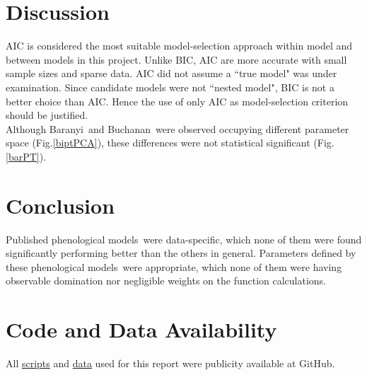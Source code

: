 \documentclass[a4paper, 11pt]{article}
\newcommand{\pms}{phenological models}
\newcommand{\fba}{Baranyi}
\newcommand{\fbu}{Buchanan}
\begin{document}
	\section*{Discussion}
	
	AIC is considered the most suitable model-selection approach within model and between models in this project.  Unlike BIC, AIC are more accurate with small sample sizes\autocite{acquah2010comparison,kuha2004aic} and sparse data\autocite{kuha2004aic}.  AIC did not assume a ``true model" was under examination\autocite{aho2014model,vrieze2012model,yang2005can}.  Since candidate models were not ``nested model", BIC is not a better choice than AIC\autocite{wang2006comparison}.  Hence the use of only AIC as model-selection criterion should be justified.\\
	
	Although \fba\ and \fbu\ were observed occupying different parameter space (Fig.\ref{biptPCA}), these differences were not statistical significant (Fig.\ref{barPT}).
	
	\section*{Conclusion}
	Published \pms\ were data-specific, which none of them were found significantly performing better than the others in general.  Parameters defined by these \pms\ were appropriate, which none of them were having observable domination nor negligible weights on the function calculations.
	
	\section*{Code and Data Availability}
	All \href{https://github.com/ph-u/CMEECourseWork_pmH/tree/master/MiniProject/code}{scripts} and \href{https://github.com/ph-u/CMEECourseWork_pmH/tree/master/MiniProject/data}{data} used for this report were publicity available at GitHub.
	\nocite{*}\printbibliography
	\clearpage
\end{document}

